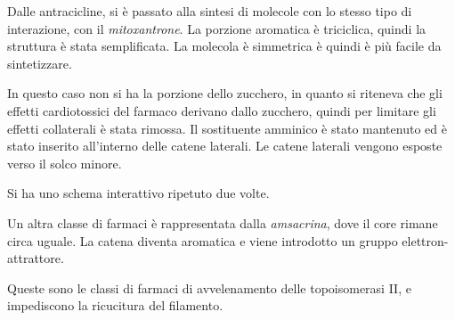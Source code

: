 Dalle antracicline, si è passato alla sintesi di molecole con lo stesso
tipo di interazione, con il \emph{mitoxantrone}. La porzione aromatica è
triciclica, quindi la struttura è stata semplificata. La molecola è
simmetrica è quindi è più facile da sintetizzare.

In questo caso non si ha la porzione dello zucchero, in quanto si
riteneva che gli effetti cardiotossici del farmaco derivano dallo
zucchero, quindi per limitare gli effetti collaterali è stata rimossa.
Il sostituente amminico è stato mantenuto ed è stato inserito
all'interno delle catene laterali. Le catene laterali vengono esposte
verso il solco minore.

Si ha uno schema interattivo ripetuto due volte.


Un altra classe di farmaci è rappresentata dalla \emph{amsacrina}, dove il core
rimane circa uguale. La catena diventa aromatica e viene introdotto un
gruppo elettron-attrattore.

Queste sono le classi di farmaci di avvelenamento delle topoisomerasi
II, e impediscono la ricucitura del filamento.

